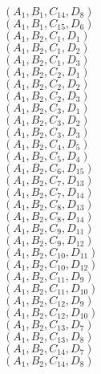 \documentclass[14pt]{article}
\begin{document}
    $({A}_{1}, {B}_{1}, {C}_{14}, {D}_{8}) $ \\ 
    $({A}_{1}, {B}_{1}, {C}_{15}, {D}_{6}) $ \\ 
    $({A}_{1}, {B}_{2}, {C}_{1}, {D}_{1}) $ \\ 
    $({A}_{1}, {B}_{2}, {C}_{1}, {D}_{2}) $ \\ 
    $({A}_{1}, {B}_{2}, {C}_{1}, {D}_{3}) $ \\ 
    $({A}_{1}, {B}_{2}, {C}_{2}, {D}_{1}) $ \\ 
    $({A}_{1}, {B}_{2}, {C}_{2}, {D}_{2}) $ \\ 
    $({A}_{1}, {B}_{2}, {C}_{2}, {D}_{3}) $ \\ 
    $({A}_{1}, {B}_{2}, {C}_{3}, {D}_{1}) $ \\ 
    $({A}_{1}, {B}_{2}, {C}_{3}, {D}_{2}) $ \\ 
    $({A}_{1}, {B}_{2}, {C}_{3}, {D}_{3}) $ \\ 
    $({A}_{1}, {B}_{2}, {C}_{4}, {D}_{5}) $ \\ 
    $({A}_{1}, {B}_{2}, {C}_{5}, {D}_{4}) $ \\ 
    $({A}_{1}, {B}_{2}, {C}_{6}, {D}_{15}) $ \\ 
    $({A}_{1}, {B}_{2}, {C}_{7}, {D}_{13}) $ \\ 
    $({A}_{1}, {B}_{2}, {C}_{7}, {D}_{14}) $ \\ 
    $({A}_{1}, {B}_{2}, {C}_{8}, {D}_{13}) $ \\ 
    $({A}_{1}, {B}_{2}, {C}_{8}, {D}_{14}) $ \\ 
    $({A}_{1}, {B}_{2}, {C}_{9}, {D}_{11}) $ \\ 
    $({A}_{1}, {B}_{2}, {C}_{9}, {D}_{12}) $ \\ 
    $({A}_{1}, {B}_{2}, {C}_{10}, {D}_{11}) $ \\ 
    $({A}_{1}, {B}_{2}, {C}_{10}, {D}_{12}) $ \\ 
    $({A}_{1}, {B}_{2}, {C}_{11}, {D}_{9}) $ \\ 
    $({A}_{1}, {B}_{2}, {C}_{11}, {D}_{10}) $ \\ 
    $({A}_{1}, {B}_{2}, {C}_{12}, {D}_{9}) $ \\ 
    $({A}_{1}, {B}_{2}, {C}_{12}, {D}_{10}) $ \\ 
    $({A}_{1}, {B}_{2}, {C}_{13}, {D}_{7}) $ \\ 
    $({A}_{1}, {B}_{2}, {C}_{13}, {D}_{8}) $ \\ 
    $({A}_{1}, {B}_{2}, {C}_{14}, {D}_{7}) $ \\ 
    $({A}_{1}, {B}_{2}, {C}_{14}, {D}_{8}) $ \\ 
\end{document}
